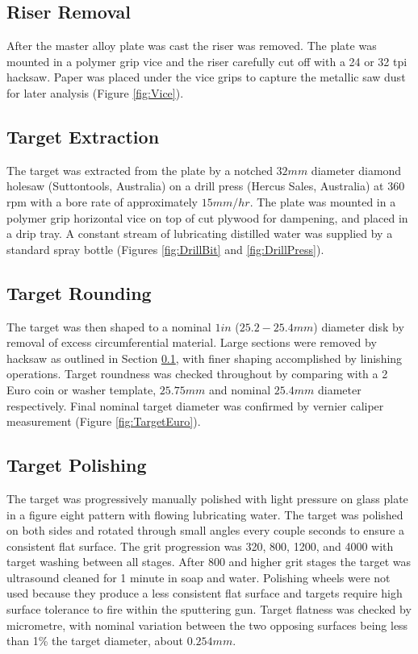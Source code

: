 \subsection{Riser Removal} \label{sec:RiserRemoval}
After the master alloy plate was cast the riser was removed. The plate was mounted in a polymer grip vice and the riser carefully cut off with a 24 or 32 \acrshort{tpi} hacksaw. Paper was placed under the vice grips to capture the metallic saw dust for later analysis (Figure \ref{fig:Vice}).

\subsection{Target Extraction}
The target was extracted from the plate by a notched $32 mm$ diameter diamond holesaw (Suttontools, Australia) on a drill press (Hercus Sales, Australia) at 360 \acrshort{rpm} with a bore rate of approximately $15 mm/hr$. The plate was mounted in a polymer grip horizontal vice on top of cut plywood for dampening, and placed in a drip tray. A constant stream of lubricating distilled water was supplied by a standard spray bottle (Figures \ref{fig:DrillBit} and \ref{fig:DrillPress}).

\subsection{Target Rounding}
The target was then shaped to a nominal $1 in$ ($25.2 - 25.4 mm$) diameter disk by removal of excess circumferential material. Large sections were removed by hacksaw as outlined in Section \ref{sec:RiserRemoval}, with finer shaping accomplished by linishing operations. Target roundness was checked throughout by comparing with a 2 Euro coin or washer template, $25.75 mm$ and nominal $25.4 mm$ diameter respectively. Final nominal target diameter was confirmed by vernier caliper measurement (Figure \ref{fig:TargetEuro}). 

\subsection{Target Polishing} \label{sec:SemiCryPolishing}
The target was progressively manually polished with light pressure on glass plate in a figure eight pattern with flowing lubricating water. The target was polished on both sides and rotated through small angles every couple seconds to ensure a consistent flat surface. The grit progression was 320, 800, 1200, and 4000 with target washing between all stages. After 800 and higher grit stages the target was ultrasound cleaned for 1 minute in soap and water. Polishing wheels were not used because they produce a less consistent flat surface and targets require high surface tolerance to fire within the sputtering gun. Target flatness was checked by micrometre, with nominal variation between the two opposing surfaces being less than 1\% the target diameter, about $0.254 mm$. 

